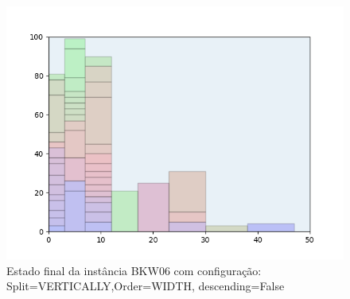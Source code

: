\begin{figure}[H]
    \centering
    \caption[]{Estado final da instância BKW06 com configuração: Split=VERTICALLY,Order=WIDTH, descending=False}
    \label{fig:bkw06-vertically-width-false}
    \includegraphics[scale=0.5]{output/figures/bkw/bkw06/vertically/width/false/00}
\end{figure}